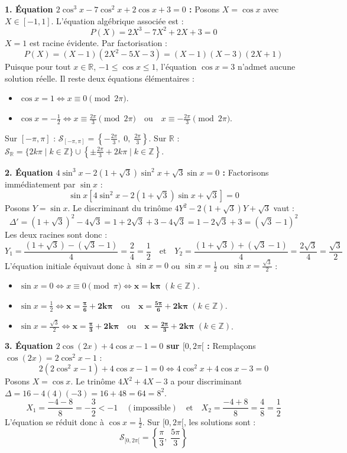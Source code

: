 \documentclass[11pt,a4paper]{article}
\newcommand{\Z}{\mathbb{Z}}
\newcommand{\R}{\mathbb{R}}
\begin{document}
\begin{correctionbox}
\textbf{1. Équation $2\cos^3 x - 7\cos^2 x + 2\cos x + 3 = 0$ :}
Posons $X = \cos x$ avec $X \in [-1, 1]$. L'équation algébrique associée est :
\[
P(X) = 2X^3 - 7X^2 + 2X + 3 = 0
\]
$X = 1$ est racine évidente. Par factorisation :
\[
P(X) = (X - 1)(2X^2 - 5X - 3) = (X - 1)(X - 3)(2X + 1)
\]
Puisque pour tout $x \in \R$, $-1 \le \cos x \le 1$, l'équation $\cos x = 3$ n'admet aucune solution réelle.
Il reste deux équations élémentaires :
\begin{itemize}[label=$\bullet$]
    \item $\cos x = 1 \iff x \equiv 0 \pmod{2\pi}$.
    \item $\cos x = -\frac{1}{2} \iff x \equiv \frac{2\pi}{3} \pmod{2\pi} \quad \text{ou} \quad x \equiv -\frac{2\pi}{3} \pmod{2\pi}$.
\end{itemize}
Sur $[-\pi, \pi]$ : $\mathcal{S}_{[-\pi, \pi]} = \left\{ -\frac{2\pi}{3}, \; 0, \; \frac{2\pi}{3} \right\}$.
Sur $\R$ : $\mathcal{S}_{\R} = \{ 2k\pi \mid k \in \Z \} \cup \left\{ \pm \frac{2\pi}{3} + 2k\pi \mid k \in \Z \right\}$.

\textbf{2. Équation $4\sin^3 x - 2(1+\sqrt{3})\sin^2 x + \sqrt{3}\sin x = 0$ :}
Factorisons immédiatement par $\sin x$ :
\[
\sin x \left[ 4\sin^2 x - 2(1+\sqrt{3})\sin x + \sqrt{3} \right] = 0
\]
Posons $Y = \sin x$. Le discriminant du trinôme $4Y^2 - 2(1+\sqrt{3})Y + \sqrt{3}$ vaut :
\[
\Delta' = (1+\sqrt{3})^2 - 4\sqrt{3} = 1 + 2\sqrt{3} + 3 - 4\sqrt{3} = 1 - 2\sqrt{3} + 3 = (\sqrt{3} - 1)^2
\]
Les deux racines sont donc :
\[
Y_1 = \frac{(1+\sqrt{3}) - (\sqrt{3}-1)}{4} = \frac{2}{4} = \frac{1}{2} \quad \text{et} \quad Y_2 = \frac{(1+\sqrt{3}) + (\sqrt{3}-1)}{4} = \frac{2\sqrt{3}}{4} = \frac{\sqrt{3}}{2}
\]
L'équation initiale équivaut donc à $\sin x = 0$ ou $\sin x = \frac{1}{2}$ ou $\sin x = \frac{\sqrt{3}}{2}$ :
\begin{itemize}[label=$\bullet$]
    \item $\sin x = 0 \iff x \equiv 0 \pmod{\pi} \iff \mathbf{x = k\pi} \; (k \in \Z)$.
    \item $\sin x = \frac{1}{2} \iff \mathbf{x = \frac{\pi}{6} + 2k\pi} \quad \text{ou} \quad \mathbf{x = \frac{5\pi}{6} + 2k\pi} \; (k \in \Z)$.
    \item $\sin x = \frac{\sqrt{3}}{2} \iff \mathbf{x = \frac{\pi}{3} + 2k\pi} \quad \text{ou} \quad \mathbf{x = \frac{2\pi}{3} + 2k\pi} \; (k \in \Z)$.
\end{itemize}

\textbf{3. Équation $2\cos(2x) + 4\cos x - 1 = 0$ sur $[0, 2\pi[$ :}
Remplaçons $\cos(2x) = 2\cos^2 x - 1$ :
\[
2(2\cos^2 x - 1) + 4\cos x - 1 = 0 \iff 4\cos^2 x + 4\cos x - 3 = 0
\]
Posons $X = \cos x$. Le trinôme $4X^2 + 4X - 3$ a pour discriminant $\Delta = 16 - 4(4)(-3) = 16 + 48 = 64 = 8^2$.
\[
X_1 = \frac{-4 - 8}{8} = -\frac{3}{2} < -1 \quad (\text{impossible}) \quad \text{et} \quad X_2 = \frac{-4 + 8}{8} = \frac{4}{8} = \frac{1}{2}
\]
L'équation se réduit donc à $\cos x = \frac{1}{2}$.
Sur $[0, 2\pi[$, les solutions sont :
\[
\mathcal{S}_{[0, 2\pi[} = \left\{ \frac{\pi}{3}, \; \frac{5\pi}{3} \right\}
\]
\end{correctionbox}
\end{document}
